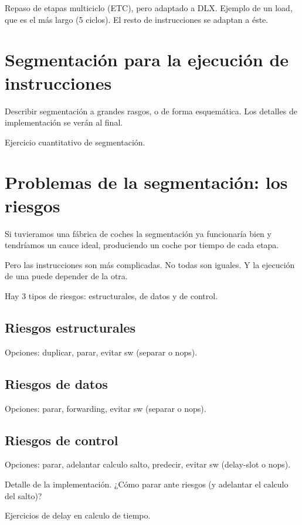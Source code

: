 \documentclass[12pt,onecolumn]{memoir}
\begin{document}
Repaso de etapas multiciclo (ETC), pero adaptado a DLX. Ejemplo de
un load, que es el más largo (5 ciclos). El resto de instrucciones se adaptan a éste. 

\section{Segmentación para la ejecución de instrucciones}

Describir segmentación a grandes rasgos, o de forma esquemática. Los
detalles de implementación se verán al final.

Ejercicio cuantitativo de segmentación.

\section{Problemas de la segmentación: los riesgos}

Si tuvieramos una fábrica de coches la segmentación ya funcionaría
bien y tendríamos un cauce ideal, produciendo un coche por tiempo de
cada etapa.

Pero las instrucciones son más complicadas. No todas son iguales. Y la
ejecución de una puede depender de la otra.

Hay 3 tipos de riesgos: estructurales, de datos y de control. 

\subsection{Riesgos estructurales}

Opciones: duplicar, parar, evitar sw (separar o nops).

\subsection{Riesgos de datos}

Opciones: parar, forwarding, evitar sw (separar o nops).

\subsection{Riesgos de control}

Opciones: parar, adelantar calculo salto, predecir, evitar sw (delay-slot o nops).

Detalle de la implementación. ¿Cómo parar ante riesgos (y adelantar el
calculo del salto)?

Ejercicios de delay en calculo de tiempo.
\end{document}
